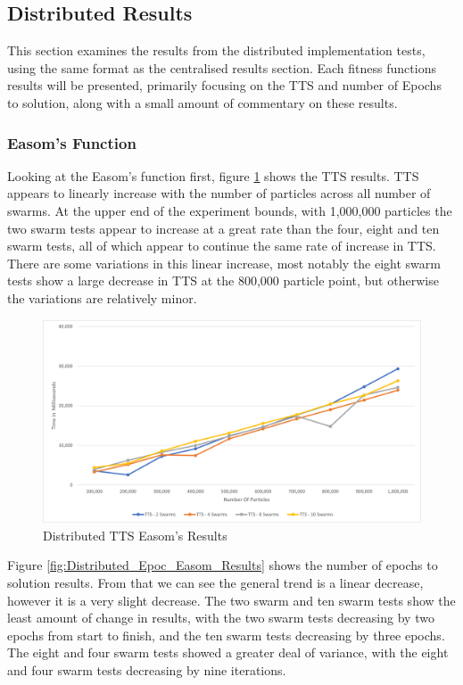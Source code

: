 \documentclass[oneside,12pt]{book}
\begin{document}
\subsection{Distributed Results}
This section examines the results from the distributed implementation tests, using the same format as the centralised results section. Each fitness functions results will be presented, primarily focusing on the TTS and number of Epochs to solution, along with a small amount of commentary on these results. 

\subsubsection{Easom's Function}
Looking at the Easom's function first, figure \ref{fig:Distributed_TTS_Easom_Results} shows the TTS results. TTS appears to linearly increase with the number of particles across all number of swarms. At the upper end of the experiment bounds, with 1,000,000 particles the two swarm tests appear to increase at a great rate than the four, eight and ten swarm tests, all of which appear to continue the same rate of increase in TTS. There are some variations in this linear increase, most notably the eight swarm tests show a large decrease in TTS at the 800,000 particle point, but otherwise the variations are relatively minor. 

\begin{figure}[H]
    \centering
    \includegraphics[scale=0.45]{Images/Graphs/DistributedEasomTTS.png}
    \caption{Distributed TTS Easom's Results}
    \label{fig:Distributed_TTS_Easom_Results}
\end{figure}

Figure \ref{fig:Distributed_Epoc_Easom_Results} shows the number of epochs to solution results. From that we can see the general trend is a linear decrease, however it is a very slight decrease. The two swarm and ten swarm tests show the least amount of change in results, with the two swarm tests decreasing by two epochs from start to finish, and the ten swarm tests decreasing by three epochs. The eight and four swarm tests showed a greater deal of variance, with the eight and four swarm tests decreasing by nine iterations.
\end{document}
